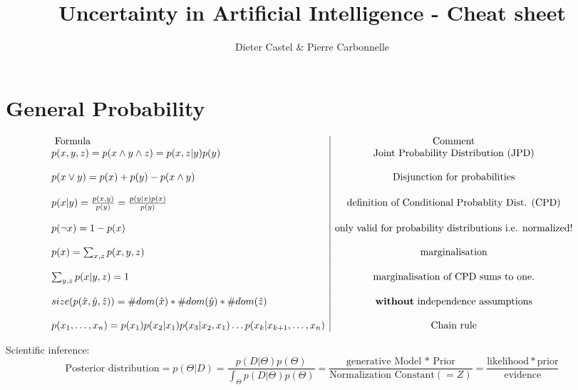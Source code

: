 \documentclass[a4paper,10pt]{article}
\title{Uncertainty in Artificial Intelligence - Cheat sheet}
\author{Dieter Castel \& Pierre Carbonnelle}
\begin{document}
\maketitle


\section{General Probability}

$$\begin{array}{l|c}
    \textrm{ Formula} & \textrm{Comment}  \\ 
    p(x,y,z) = p(x \wedge y \wedge z) = p(x,z|y)p(y) & \textrm{Joint Probability Distribution (JPD)}\\
    \\
    p(x \vee y) = p(x) + p(y) - p(x \wedge y) & \textrm{Disjunction for probabilities} \\
    \\
    p(x|y) = \frac{p(x,y)}{p(y)} = \frac{p(y|x)p(x)}{p(y)} & \textrm{definition of Conditional Probablity Dist. (CPD)}\\
    \\
    p(\neg x) = 1-p(x) & \textrm{only valid for probability distributions i.e. normalized!} \\
    \\
    p(x) = \sum_{x,z} p(x,y,z) & \textrm{marginalisation} \\
    \\
    \sum_{y,z} p(x|y,z) = 1 & \textrm{marginalisation of CPD sums to one.} \\
    \\
    size(p(\hat{x},\hat{y},\hat{z})) = \#dom(\hat{x})*\#dom(\hat{y})*\#dom(\hat{z}) & \textrm{\textbf{without} independence assumptions} \\
    \\
    p(x_1,\ldots,x_n) = p(x_1)p(x_2|x_1)p(x_3|x_2,x_1) \ldots p(x_k|x_{k+1},\ldots,x_{n}) & \textrm{Chain rule}  \\ 
  \end{array}
$$

Scientific inference:
$$ \textrm{Posterior distribution} = p(\Theta| D ) = \frac{ p(D|\Theta) p(\Theta) }{ \int_{\Theta} p(D|\Theta)p(\Theta)} = \frac{\textrm{generative Model * Prior}}{\textrm{Normalization Constant} (= Z)} = \frac{\mathrm{likelihood * prior} }{\textrm{evidence}} $$ 
\end{document}
